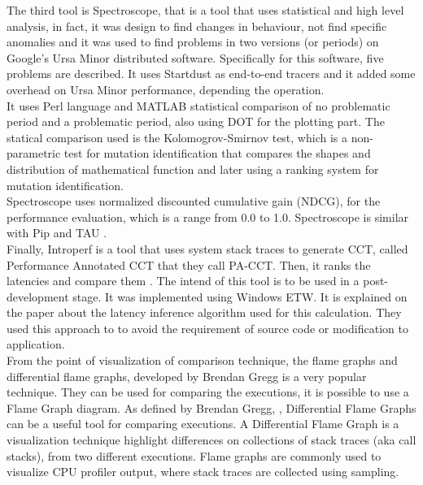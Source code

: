 The third tool is Spectroscope, that is a tool that uses statistical and high level analysis, in fact, it was design to find changes in behaviour, not find specific anomalies and it was used to find problems in two versions (or periods) on Google's Ursa Minor distributed software. Specifically for this software, five problems are described. It uses Startdust as end-to-end tracers and it added some overhead on Ursa Minor performance, depending the operation. \\
It uses Perl language and MATLAB statistical comparison of no problematic period and a problematic period, also using DOT for the plotting part.
The statical comparison used is the Kolomogrov-Smirnov test,  which is a non-parametric test for mutation identification that compares the shapes and distribution of mathematical function and later using a ranking system for mutation identification.\\
 Spectroscope uses normalized discounted cumulative gain (NDCG), for the performance evaluation, which is a range from 0.0 to 1.0. Spectroscope is similar with Pip and TAU \cite{Pip} \cite{TAU}.\\

Finally, Introperf is a tool that uses system stack traces to generate CCT, called Performance Annotated CCT that they call PA-CCT. Then, it ranks the latencies and compare them \cite{Introperf}. The intend of this tool is to be used in a post-development stage. It was implemented using Windows ETW\cite{ETW}. It is explained on the paper about the latency inference algorithm used for this calculation. They used this approach to to avoid the requirement of source code or modification to application. \\
 

From the point of visualization of comparison technique, the flame graphs and differential flame graphs, developed by Brendan Gregg is a very popular technique. They can be used for comparing the executions, it is possible to use a Flame Graph diagram. As defined by Brendan Gregg, \cite{brendan_differential}, Differential Flame Graphs can be a useful tool for comparing executions. A Differential Flame Graph is a visualization technique highlight differences on collections of stack traces (aka call stacks), from two different executions. Flame graphs are commonly used to visualize CPU profiler output, where stack traces are collected using sampling.

